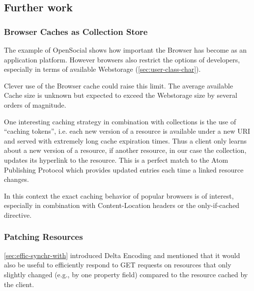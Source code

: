 \documentclass[12pt,a4paper,twoside]{scrartcl}		%
\begin{document}



\subsection{Further work}
\label{sec:further-work}

\subsubsection{Browser Caches as Collection Store}
\label{sec:browser-caches-as}

The example of OpenSocial shows how important the Browser has become as an
application platform. However browsers also restrict the options of developers,
especially in terms of available Webstorage (\autoref{sec:user-class-char}).

Clever use of the Browser cache could raise this limit. The average available
Cache size is unknown but expected to exceed the Webstorage size by several
orders of magnitude.

One interesting caching strategy in combination with collections is the use of
``caching tokens'', i.e. each new version of a resource is available under a new
URI and served with extremely long cache expiration times. Thus a client only
learns about a new version of a resource, if another resource, in our case the
collection, updates its hyperlink to the resource. This is a perfect match to
the Atom Publishing Protocol which provides updated entries each time a linked
resource changes.

In this context the exact caching behavior of popular browsers is of interest,
especially in combination with Content-Location headers or the only-if-cached
directive.

\subsubsection{Patching Resources}
\label{sec:patching-resources}

\autoref{sec:effic-synchr-with} introduced Delta Encoding\cite{RFC3229} and
mentioned that it would also be useful to efficiently respond to GET requests on
resources that only slightly changed (e.g., by one property field) compared to
the resource cached by the client.
\end{document}
